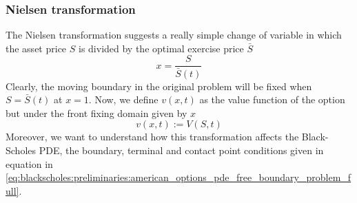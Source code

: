 \subsubsection{Nielsen transformation} \label{sec:blackscholes:frontfixingmethod:nielsen}
The Nielsen transformation suggests a really simple change of variable in which
the asset price $S$ is divided by the optimal exercise price $\bar{S}$
\begin{equation}
  x = \dfrac{S}{\bar{S}(t)}
  \label{eq:blackscholes:frontfixingmethod:nielsen}
\end{equation}
Clearly, the moving boundary in the original problem will be fixed when $S=\bar{S}(t)$ at $x=1$. Now, we define $v(x,t)$ as the value function of the option but under the front fixing domain given by $x$
\begin{equation}
  v(x, t) := V(S, t)
  \label{eq:blackscholes:frontfixingmethod:nielsen:value_function}
\end{equation}
Moreover, we want to understand how this transformation affects the Black-Scholes PDE, the boundary, terminal and contact point conditions given in equation in \eqref{eq:blackscholes:preliminaries:american_options_pde_free_boundary_problem_full}.

